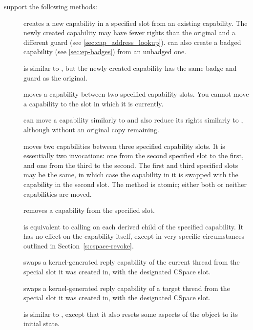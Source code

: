  support the following methods:
\begin{description}
\item[] creates a new
  capability in a specified  slot from an existing
  capability.  The newly created capability may have fewer rights than
  the original and a different guard (see
  \autoref{sec:cap_address_lookup}). 
  can also create a badged capability (see \autoref{sec:ep-badges})
  from an unbadged one.
\item[] is similar to
  , but the newly created
  capability has the same badge and guard as the original.
\item[] moves a capability
  between two specified capability slots. You cannot move a capability
  to the slot in which it is currently.
\item[] can move a
  capability similarly to  and
  also reduce its rights similarly to
  , although without an
  original copy remaining.
\item[] moves two
  capabilities between three specified capability slots. It is
  essentially two  invocations:
  one from the second specified slot to the first, and one from the
  third to the second. The first and third specified slots may be the
  same, in which case the capability in it is swapped with the
  capability in the second slot. The method is atomic; either both or
  neither capabilities are moved.
\item[] removes a
  capability from the specified slot.
\item[] is equivalent to
  calling  on each derived
  child of the specified capability. It has no effect on the
  capability itself, except in very specific circumstances outlined
  in Section~\ref{s:cspace-revoke}.
\item[] swaps a
  kernel-generated reply capability of the current thread from the
  special  slot it was created in, with the designated CSpace
  slot. 
\item[] swaps a
  kernel-generated reply capability of a target thread from the
  special  slot it was created in, with the designated CSpace
  slot.
\item[] is similar to
  , except that it also
  resets some aspects of the object to its initial state.
\end{description}

